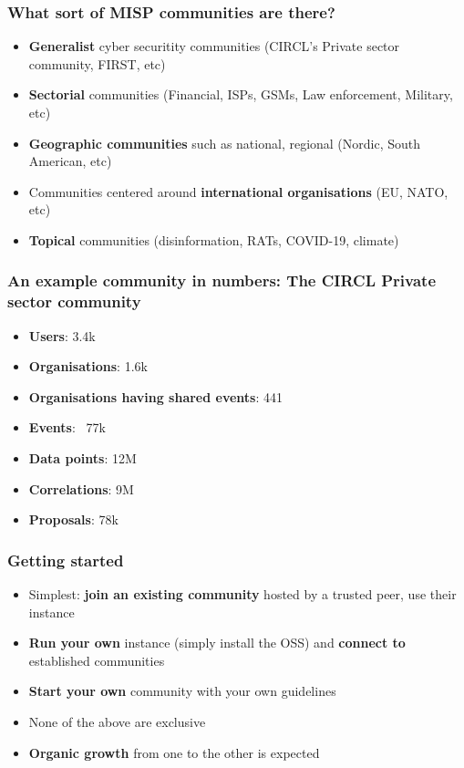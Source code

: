 \begin{frame}
\frametitle{What sort of MISP communities are there?}
\begin{itemize}
       \item {\bf Generalist} cyber securitity communities (CIRCL's Private sector community, FIRST, etc)
       \item {\bf Sectorial} communities (Financial, ISPs, GSMs, Law enforcement, Military, etc)
       \item {\bf Geographic communities} such as national, regional (Nordic, South American, etc)
       \item Communities centered around {\bf international organisations} (EU, NATO, etc)
       \item {\bf Topical} communities (disinformation, RATs, COVID-19, climate)
\end{itemize}
\end{frame}

\begin{frame}
\frametitle{An example community in numbers: The CIRCL Private sector community}
\begin{itemize}
       \item {\bf Users}: 3.4k
       \item {\bf Organisations}: 1.6k
       \item {\bf Organisations having shared events}: 441
       \item {\bf Events}: ~77k
       \item {\bf Data points}: 12M
       \item {\bf Correlations}: 9M
       \item {\bf Proposals}: 78k
\end{itemize}
\end{frame}

\begin{frame}
\frametitle{Getting started}
\begin{itemize}
       \item Simplest: {\bf join an existing community} hosted by a trusted peer, use their instance
       \item {\bf Run your own} instance (simply install the OSS) and {\bf connect to} established communities
       \item {\bf Start your own} community with your own guidelines
       \item None of the above are exclusive
       \item {\bf Organic growth} from one to the other is expected
\end{itemize}
\end{frame}

